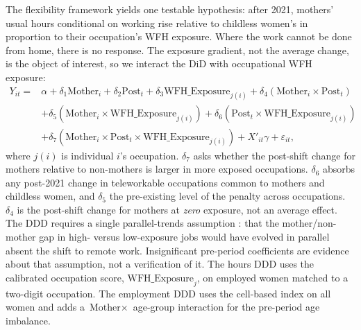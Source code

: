\documentclass[12pt,a4paper]{article}
\newcommand{\Mother}{\text{Mother}}
\newcommand{\Post}{\text{Post}}
\newcommand{\WFH}{\text{WFH\_Exposure}}
\begin{document}
The flexibility framework \citep{goldin2014} yields one testable hypothesis: after 2021,
mothers' usual hours conditional on working rise relative to childless women's in proportion to
their occupation's WFH exposure. Where the work cannot be done from home, there is no response.
The exposure gradient, not the average change, is the object of interest, so we interact the DiD
with occupational WFH exposure:
\begin{equation}\label{eq:ddd}
\begin{split}
Y_{it} = {}& \alpha + \delta_1 \Mother_i + \delta_2 \Post_t + \delta_3 \WFH_{j(i)}
+ \delta_4 (\Mother_i \times \Post_t) \\
& + \delta_5 (\Mother_i \times \WFH_{j(i)}) + \delta_6 (\Post_t \times \WFH_{j(i)}) \\
& + \delta_7 (\Mother_i \times \Post_t \times \WFH_{j(i)}) + X'_{it}\gamma + \varepsilon_{it},
\end{split}
\end{equation}
where $j(i)$ is individual $i$'s occupation. $\delta_7$ asks whether the post-shift change for
mothers relative to non-mothers is larger in more exposed occupations. $\delta_6$ absorbs any
post-2021 change in teleworkable occupations common to mothers and childless women, and
$\delta_5$ the pre-existing level of the penalty across occupations.
$\delta_4$ is the post-shift change for mothers at \emph{zero} exposure, not an average effect.
The DDD requires a single parallel-trends assumption \citep{olden2022}: that the
mother/non-mother gap in high- versus low-exposure jobs would have evolved in parallel absent the
shift to remote work. Insignificant pre-period coefficients are evidence about that assumption,
not a verification of it. The hours DDD uses the calibrated occupation score, $\WFH_j$, on
employed women matched to a two-digit occupation. The employment DDD uses the cell-based index on
all women and adds a $\Mother \times {}$ age-group interaction for the pre-period age imbalance.
\end{document}
